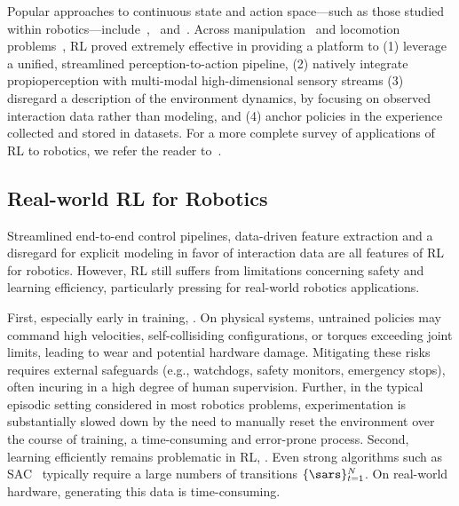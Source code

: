 Popular approaches to continuous state and action space---such as those studied within robotics---include~\citet[TRPO]{schulmanTrustRegionPolicy2017},~\citet[PPO]{ schulmanProximalPolicyOptimization2017} and~\citet[SAC]{ haarnojaSoftActorCriticOffPolicy2018}.
Across manipulation~\citep{akkayaSolvingRubiksCube2019} and locomotion problems~\citep{leeLearningQuadrupedalLocomotion2020}, RL proved extremely effective in providing a platform to (1) leverage a unified, streamlined perception-to-action pipeline, (2) natively integrate propioperception with multi-modal high-dimensional sensory streams  (3) disregard a description of the environment dynamics, by focusing on observed interaction data rather than modeling, and (4) anchor policies in the experience collected and stored in datasets.
For a more complete survey of applications of RL to robotics, we refer the reader to~\citet{koberReinforcementLearningRobotics,tangDeepReinforcementLearning2025}.

\subsection{Real-world RL for Robotics}
Streamlined end-to-end control pipelines, data-driven feature extraction and a disregard for explicit modeling in favor of interaction data are all features of RL for robotics.
However, RL still suffers from limitations concerning safety and learning efficiency, particularly pressing for real-world robotics applications.

First, especially early in training, .
On physical systems, untrained policies may command high velocities, self-collisiding configurations, or torques exceeding joint limits, leading to wear and potential hardware damage.
Mitigating these risks requires external safeguards (e.g., watchdogs, safety monitors, emergency stops), often incuring in a high degree of human supervision.
Further, in the typical episodic setting considered in most robotics problems, experimentation is substantially slowed down by the need to manually reset the environment over the course of training, a time-consuming and error-prone process.
Second, learning efficiently remains problematic in RL, .
Even strong algorithms such as SAC~\citep{haarnojaSoftActorCriticOffPolicy2018} typically require a large numbers of transitions \( \{ \sars \}_{t=1}^N \).
On real-world hardware, generating this data is time-consuming.

